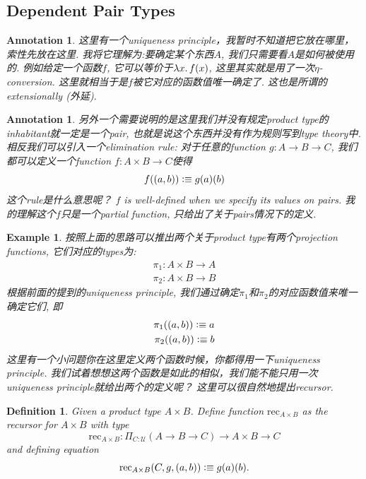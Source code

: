 \documentclass{article}
\newtheorem{example}[theorem]{Example}
\newtheorem{definition}[theorem]{Definition}
\newtheorem{annotation}[theorem]{Annotation}
\newcommand{\lam}[2]{\ensuremath{\lambda #1\ldotp #2}} %
\newcommand{\defeqv}{\vcentcolon\equiv}
\begin{document}
\subsection{Dependent Pair Types}

\begin{annotation}
\rm 这里有一个uniqueness principle，我暂时不知道把它放在哪里，索性先放在这里. 我将它理解为:要确定某个东西$A$, 我们只需要看$A$是如何被使用的. 例如给定一个函数$f$, 它可以等价于$\lam{x}{f(x)}$, 这里其实就是用了一次$\eta$-conversion. 这里就相当于是$f$被它对应的函数值唯一确定了. 这也是所谓的extensionally (外延). %
\end{annotation}

\begin{annotation}
\rm 另外一个需要说明的是这里我们并没有规定product type的inhabitant就一定是一个pair, 也就是说这个东西并没有作为规则写到type theory中. 相反我们可以引入一个elimination rule: 对于任意的function $g: A \to B \to C$, 我们都可以定义一个function $f: A \times B \to C$使得
\[
	f((a,b)) \defeqv g(a)(b)
\]
这个rule是什么意思呢？ $f$ is well-defined when we specify its values on pairs. 我的理解这个$f$只是一个partial function, 只给出了关于pairs情况下的定义. %
\end{annotation}

\begin{example}
\rm 按照上面的思路可以推出两个关于product type有两个projection functions, 它们对应的types为:
\[
	\begin{aligned}
	\pi_1: A \times B \to A \\
	\pi_2: A \times B \to B
	\end{aligned}
\]
根据前面的提到的uniqueness principle, 我们通过确定$\pi_1$和$\pi_2$的对应函数值来唯一确定它们, 即
\[
	\begin{aligned}
	\pi_1((a,b)) \defeqv a \\
	\pi_2((a,b)) \defeqv b 
	\end{aligned}
\]
这里有一个小问题你在这里定义两个函数时候，你都得用一下uniqueness principle. 我们试着想想这两个函数是如此的相似，我们能不能只用一次uniqueness principle就给出两个的定义呢？ 这里可以很自然地提出recursor.
\end{example}

\begin{definition}
\rm Given a product type $A \times B$. Define function $\text{rec}_{A \times B}$ as the recursor for $A \times B$ with type
\[
	\text{rec}_{A \times B}:\Pi_{C:\mathcal{U}}(A \to B \to C) \to A \times B \to C
\]
and defining equation
\[
	\text{rec}_{A \times B}(C, g, (a,b)) \defeqv g(a)(b).
\]
\end{definition}
\end{document}
